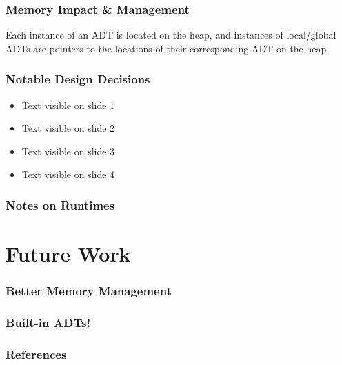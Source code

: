 \documentclass{beamer}
\begin{document}
\begin{frame}
\frametitle{Memory Impact \& Management}

Each instance of an ADT is located on the heap, and instances of local/global ADTs are pointers to the locations of their corresponding ADT on the heap.

\end{frame}

\begin{frame}
\frametitle{Notable Design Decisions}

\begin{itemize}
 \item<1-> Text visible on slide 1
 \item<2-> Text visible on slide 2
 \item<3-> Text visible on slide 3
 \item<4-> Text visible on slide 4
\end{itemize}

\end{frame}

\begin{frame}
\frametitle{Notes on Runtimes}
\end{frame}

\section{Future Work}

\begin{frame}
\frametitle{Better Memory Management}
\end{frame}

\begin{frame}
\frametitle{Built-in ADTs!}
\end{frame}


\begin{frame}
\frametitle{References}
\end{frame}
\end{document}
